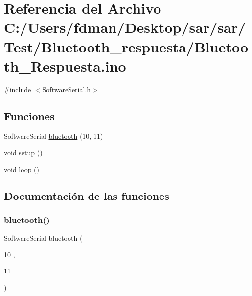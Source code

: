 \hypertarget{_bluetooth___respuesta_8ino}{}\section{Referencia del Archivo C\+:/\+Users/fdman/\+Desktop/sar/sar/\+Test/\+Bluetooth\+\_\+respuesta/\+Bluetooth\+\_\+\+Respuesta.ino}
\label{_bluetooth___respuesta_8ino}
{\ttfamily \#include $<$Software\+Serial.\+h$>$}\newline
\subsection*{Funciones}
\begin{DoxyCompactItemize}
\item 
Software\+Serial \hyperlink{_bluetooth___respuesta_8ino_a2e70a7fdaa23751d09e00821518e2e8e}{bluetooth} (10, 11)
\item 
void \hyperlink{_bluetooth___respuesta_8ino_a4fc01d736fe50cf5b977f755b675f11d}{setup} ()
\item 
void \hyperlink{_bluetooth___respuesta_8ino_afe461d27b9c48d5921c00d521181f12f}{loop} ()
\end{DoxyCompactItemize}


\subsection{Documentación de las funciones}
\mbox{\label{_bluetooth___respuesta_8ino_a2e70a7fdaa23751d09e00821518e2e8e}} 
\subsubsection{\texorpdfstring{bluetooth()}{bluetooth()}}
{\footnotesize\ttfamily Software\+Serial bluetooth (\begin{DoxyParamCaption}\item[{10}]{,  }\item[{11}]{ }\end{DoxyParamCaption})}

\mbox{\label{_bluetooth___respuesta_8ino_afe461d27b9c48d5921c00d521181f12f}} 
